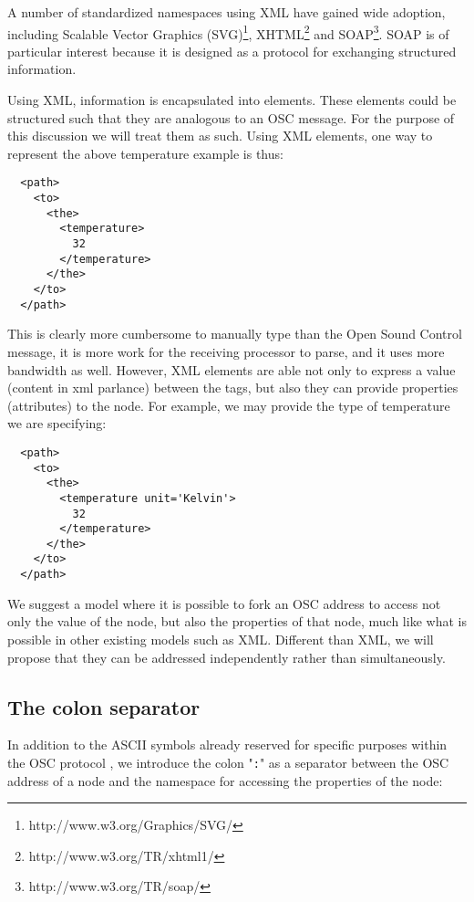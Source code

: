 \documentclass{sig-alternate}
\begin{document}
A number of standardized namespaces using XML have gained wide adoption, including Scalable Vector Graphics (SVG)\footnote{http://www.w3.org/Graphics/SVG/}, XHTML\footnote{http://www.w3.org/TR/xhtml1/} and SOAP\footnote{http://www.w3.org/TR/soap/}.  SOAP is of particular interest because it is designed as a protocol for exchanging structured information.

Using XML, information is encapsulated into elements.  These elements could be structured such that they are analogous to an OSC message. For the purpose of this discussion we will treat them as such.  Using XML elements, one way to represent the above temperature example is thus:

\begin{lstlisting}
  <path>
    <to>
      <the>
        <temperature> 
          32
        </temperature>
      </the>
    </to>
  </path>
\end{lstlisting}

This is clearly more cumbersome to manually type than the Open Sound Control message, it is more work for the receiving processor to parse, and it uses more bandwidth as well. However, XML elements are able not only to express a value (content in xml parlance) between the tags, but also they can provide properties (attributes) to the node. For example, we may provide the type of temperature we are specifying:

\begin{lstlisting}
  <path>
    <to>
      <the>
        <temperature unit='Kelvin'>
          32
        </temperature>
      </the>
    </to>
  </path>
\end{lstlisting}

We suggest a model where it is possible to fork an OSC address to access not only the value of the node, but also the properties of that node, much like what is possible in other existing models such as XML.  Different than XML, we will propose that they can be addressed independently rather than simultaneously.


\subsection{The colon separator} %
\label{sub:the_colon_separator}

In addition to the ASCII symbols already reserved for specific purposes within the OSC protocol \cite{Wright:1997}, we introduce the colon "\texttt{:}" as a separator between the OSC address of a node and the namespace for accessing the properties of the node:
\end{document}

